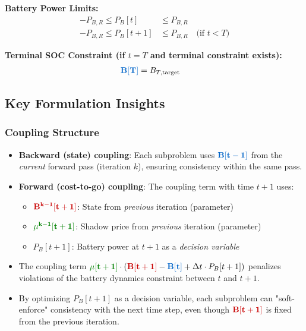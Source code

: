 \documentclass[11pt]{article}
\newcommand{\blueB}[1]{\textcolor{bluevar}{\mathbf{#1}}}      %
\newcommand{\redB}[1]{\textcolor{redvar}{\mathbf{#1}}}        %
\newcommand{\greenmu}[1]{\textcolor{greenvar}{\mathbf{#1}}}   %
\begin{document}
\textbf{Battery Power Limits:}
\begin{align}
-P_{B,R} \leq P_B[t] &\leq P_{B,R} \\
-P_{B,R} \leq P_B[t+1] &\leq P_{B,R} \quad \text{(if } t < T\text{)}
\end{align}

\textbf{Terminal SOC Constraint (if $t = T$ and terminal constraint exists):}
\begin{align}
\blueB{B[T]} &= B_{T,\text{target}}
\end{align}

\subsection{Key Formulation Insights}

\subsubsection{Coupling Structure}
\begin{itemize}
    \item \textbf{Backward (state) coupling}: Each subproblem uses $\blueB{B[t-1]}$ from the \textit{current} forward pass (iteration $k$), ensuring consistency within the same pass.
    
    \item \textbf{Forward (cost-to-go) coupling}: The coupling term with time $t+1$ uses:
    \begin{itemize}
        \item $\redB{B^{k-1}[t+1]}$: State from \textit{previous} iteration (parameter)
        \item $\greenmu{\mu^{k-1}[t+1]}$: Shadow price from \textit{previous} iteration (parameter)
        \item $P_B[t+1]$: Battery power at $t+1$ as a \textit{decision variable}
    \end{itemize}
    
    \item The coupling term $\greenmu{\mu[t+1]} \cdot (\redB{B[t+1]} - \blueB{B[t]} + \Delta t \cdot P_B[t+1])$ penalizes violations of the battery dynamics constraint between $t$ and $t+1$.
    
    \item By optimizing $P_B[t+1]$ as a decision variable, each subproblem can "soft-enforce" consistency with the next time step, even though $\redB{B[t+1]}$ is fixed from the previous iteration.
\end{itemize}
\end{document}

